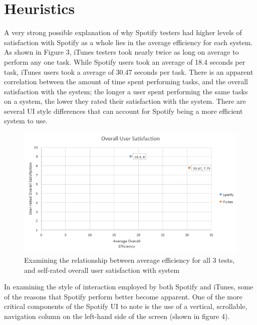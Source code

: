 \documentclass[12pt]{article}
\begin{document}
\section{Heuristics}
\label{heuristics}

A very strong possible explanation of why Spotify testers had higher 
levels of satisfaction with Spotify as a whole lies in the average 
efficiency for each system. As shown in Figure 3, iTunes testers 
took nearly twice as long on average to perform any one task. 
While Spotify users took an average of 18.4 seconds per task, 
iTunes users took a average of 30.47 seconds per task. There is an 
apparent correlation between the amount of time spent performing 
tasks, and the overall satisfaction with the system; the longer a 
user spent performing the same tasks on a system, the lower they 
rated their satisfaction with the system. There are several UI 
style differences that can account for Spotify being a more 
efficient system to use.

\begin{figure}[H]
	\centering
	\includegraphics[width=.75\textwidth]{chart3.png}
	\caption{Examining the relationship between average 
efficiency for all 3 tests, and self-rated overall user 
satisfaction with system}
\end{figure}

In examining the style of interaction employed by both Spotify and 
iTunes, some of the reasons that Spotify perform better become 
apparent. One of the more critical components of the Spotify UI to 
note is the use of a vertical, scrollable, navigation column on 
the left-hand side of the screen (shown in figure 4). 
\end{document}
